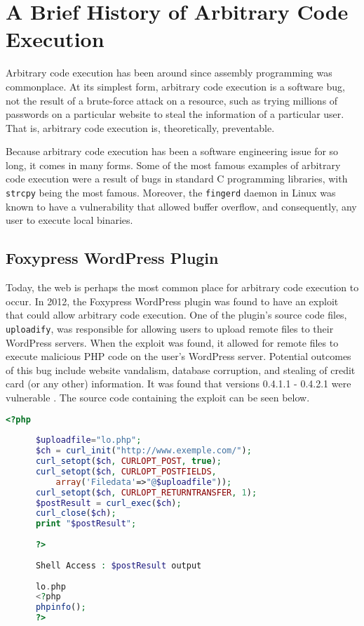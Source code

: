 \section{A Brief History of Arbitrary Code Execution}

Arbitrary code execution has been around since assembly programming was commonplace. At its simplest form, arbitrary code execution is a software bug, not the result of a brute-force attack on a resource, such as trying millions of passwords on a particular website to steal the information of a particular user. That is, arbitrary code execution is, theoretically, preventable.

Because arbitrary code execution has been a software engineering issue for so long, it comes in many forms. Some of the most famous examples of arbitrary code execution were a result of bugs in standard C programming libraries, with \texttt{strcpy} being the most famous. Moreover, the \texttt{fingerd} daemon in Linux was known to have a vulnerability that allowed buffer overflow, and consequently, any user to execute local binaries.

\subsection{Foxypress WordPress Plugin}

Today, the web is perhaps the most common place for arbitrary code execution to occur. In 2012, the Foxypress WordPress plugin was found to have an exploit that could allow arbitrary code execution. One of the plugin's source code files, \texttt{uploadify}, was responsible for allowing users to upload remote files to their WordPress servers. When the exploit was found, it allowed for remote files to execute malicious PHP code on the user's WordPress server. Potential outcomes of this bug include website vandalism, database corruption, and stealing of credit card (or any other) information. It was found that versions 0.4.1.1 - 0.4.2.1 were vulnerable \cite{foxypress_2012}. The source code containing the exploit can be seen below.

\begin{lstlisting}[language=PHP]
      <?php
       
      $uploadfile="lo.php";
      $ch = curl_init("http://www.exemple.com/");
      curl_setopt($ch, CURLOPT_POST, true);
      curl_setopt($ch, CURLOPT_POSTFIELDS,
          array('Filedata'=>"@$uploadfile"));
      curl_setopt($ch, CURLOPT_RETURNTRANSFER, 1);
      $postResult = curl_exec($ch);
      curl_close($ch);
      print "$postResult";
       
      ?>
       
      Shell Access : $postResult output
       
      lo.php
      <?php
      phpinfo();
      ?>
\end{lstlisting}

